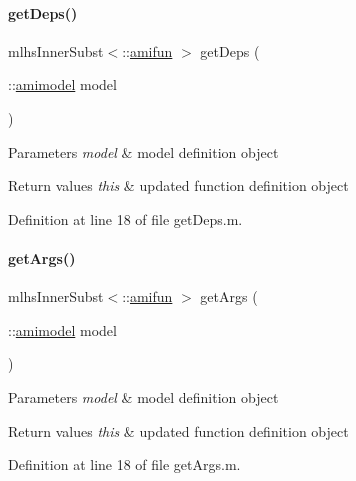 \paragraph{\texorpdfstring{getDeps()}{getDeps()}}
{\footnotesize\ttfamily mlhs\+Inner\+Subst$<$\+::\mbox{\hyperlink{classamifun}{amifun}} $>$ get\+Deps (\begin{DoxyParamCaption}\item[{\+::\mbox{\hyperlink{classamimodel}{amimodel}}}]{model }\end{DoxyParamCaption})}


\begin{DoxyParams}{Parameters}
{\em model} & model definition object\\
\hline
\end{DoxyParams}

\begin{DoxyRetVals}{Return values}
{\em this} & updated function definition object \\
\hline
\end{DoxyRetVals}


Definition at line 18 of file get\+Deps.\+m.

\mbox{\label{classamifun_a4b16e7670c0d60e530545e58628bde3f}} 
\paragraph{\texorpdfstring{getArgs()}{getArgs()}}
{\footnotesize\ttfamily mlhs\+Inner\+Subst$<$\+::\mbox{\hyperlink{classamifun}{amifun}} $>$ get\+Args (\begin{DoxyParamCaption}\item[{\+::\mbox{\hyperlink{classamimodel}{amimodel}}}]{model }\end{DoxyParamCaption})}


\begin{DoxyParams}{Parameters}
{\em model} & model definition object\\
\hline
\end{DoxyParams}

\begin{DoxyRetVals}{Return values}
{\em this} & updated function definition object \\
\hline
\end{DoxyRetVals}


Definition at line 18 of file get\+Args.\+m.

